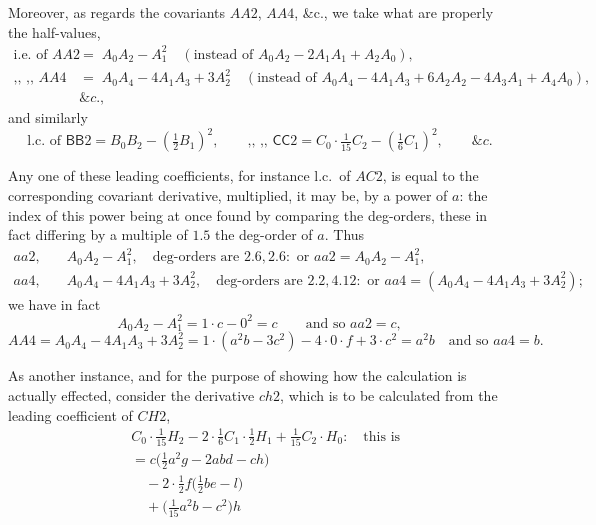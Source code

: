 \documentclass[11pt]{article}
\begin{document}
Moreover, as regards the covariants $AA2$, $AA4$, \&c., we take what are properly the half-values,
\begin{align*}
\text{i.e.\ of } AA2 \;&=\; A_{0}A_{2} - A_{1}^{2} \quad (\text{instead of } A_{0}A_{2}-2A_{1}A_{1}+A_{2}A_{0}), \\
\text{,, ,, } AA4 \;&=\; A_{0}A_{4} - 4A_{1}A_{3} + 3A_{2}^{2} \quad (\text{instead of } A_{0}A_{4}-4A_{1}A_{3}+6A_{2}A_{2}-4A_{3}A_{1}+A_{4}A_{0}), \\
&\&c.,
\end{align*}
and similarly
\[
\text{l.c.\ of } \mathsf{BB}2 = B_{0}B_{2} - (\tfrac{1}{2}B_{1})^{2}, \qquad
\text{,, ,, } \mathsf{CC}2 = C_{0}\cdot\tfrac{1}{15}C_{2} - (\tfrac{1}{6}C_{1})^{2}, \qquad \&c.
\]

Any one of these leading coefficients, for instance l.c.\ of $AC2$, is equal to the corresponding covariant derivative, multiplied, it may be, by a power of $a$: the index of this power being at once found by comparing the deg-orders, these in fact differing by a multiple of $1.5$ the deg-order of $a$. Thus
\begin{align*}
aa2,\quad & A_{0}A_{2}-A_{1}^{2}, \quad \text{deg-orders are } 2.6, 2.6: \text{ or } aa2 = A_{0}A_{2}-A_{1}^{2}, \\
aa4,\quad & A_{0}A_{4}-4A_{1}A_{3}+3A_{2}^{2}, \quad \text{deg-orders are } 2.2, 4.12: \text{ or } aa4 = (A_{0}A_{4}-4A_{1}A_{3}+3A_{2}^{2});
\end{align*}
we have in fact
\[
A_{0}A_{2}-A_{1}^{2} = 1\cdot c - 0^{2} = c \qquad \text{and so } aa2 = c,
\]
\[
AA4 = A_{0}A_{4}-4A_{1}A_{3}+3A_{2}^{2} = 1\cdot(a^{2}b-3c^{2}) - 4\cdot 0\cdot f + 3\cdot c^{2} = a^{2}b \quad \text{and so } aa4 = b.
\]

\medskip

As another instance, and for the purpose of showing how the calculation is actually effected, consider the derivative $ch2$, which is to be calculated from the leading coefficient of $CH2$,
\begin{align*}
&C_{0}\cdot\tfrac{1}{15}H_{2} - 2\cdot\tfrac{1}{6}C_{1}\cdot\tfrac{1}{2}H_{1} + \tfrac{1}{15}C_{2}\cdot H_{0} : \quad \text{this is} \\
&= c\bigl(\tfrac{1}{2}a^{2}g - 2abd - ch\bigr) \\
&\quad -2\cdot\tfrac{1}{2}f\bigl(\tfrac{1}{2}be-l\bigr) \\
&\quad +\bigl(\tfrac{1}{15}a^{2}b-c^{2}\bigr)h
\end{align*}

\newpage
\end{document}
